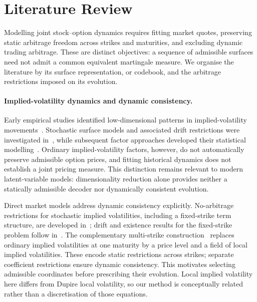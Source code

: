 \section{Literature Review}
\label{app:literature-review}

Modelling joint stock--option dynamics requires fitting market quotes, preserving static arbitrage
freedom across strikes and maturities, and excluding dynamic trading arbitrage. These are
distinct objectives: a sequence of admissible surfaces need not admit a common equivalent
martingale measure. We organise the literature by its surface representation, or codebook, and
the arbitrage restrictions imposed on its evolution.

\paragraph{Implied-volatility dynamics and dynamic consistency.} Early empirical studies identified
low-dimensional patterns in implied-volatility movements~\cite{SkiadopoulosHodgesClewlow2000,ContDaFonseca2002Dynamics,FenglerHardleVilla2003}. Stochastic surface models and
associated drift restrictions were investigated in~\cite{ContVol}, while subsequent factor approaches developed
their statistical modelling~\cite{Hafner2004,FenglerHardleMammen2007}. Ordinary implied-volatility factors, however, do not automatically
preserve admissible option prices, and fitting historical dynamics does not establish a joint pricing
measure. This distinction remains relevant to modern latent-variable models: dimensionality
reduction alone provides neither a statically admissible decoder nor dynamically consistent
evolution.

Direct market models address dynamic consistency explicitly. No-arbitrage restrictions for
stochastic implied volatilities, including a fixed-strike term structure, are developed in~\cite{Schonbucher1999}; drift
and existence results for the fixed-strike problem follow in~\cite{SchweizerWisselTerm2008}. The complementary multi-strike
construction~\cite{SchweizerWissel2008} replaces ordinary implied volatilities at one maturity by a price level and a field
of local implied volatilities. These encode static restrictions across strikes; separate coefficient
restrictions ensure dynamic consistency. This motivates selecting admissible coordinates before
prescribing their evolution. Local implied volatility here differs from Dupire local volatility, so
our method is conceptually related rather than a discretisation of those equations.

